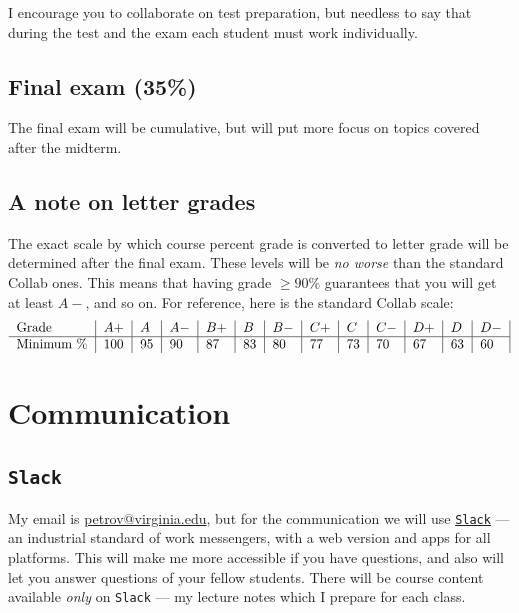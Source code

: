 \documentclass[oneside,11pt]{amsart}
\begin{document}
I encourage you to collaborate on test preparation, but needless to say that
during the test and the exam each student must work individually.

\subsection{Final exam (35\%)}

The final exam will be cumulative, but will put more focus on topics covered after the midterm.

\subsection*{A note on letter grades}

The exact scale
by which course percent grade is converted to letter grade
will be determined after the final exam. 
These levels will be \emph{no worse} than the standard Collab ones. 
This means that having grade $\ge 90\%
$
guarantees that you will get at least $A-$, and so on.
For reference, here is the standard Collab scale:
\begin{equation*}
	\begin{tabular}{l|l|l|l|l|l|l|l|l|l|l|l|l|}
		Grade      & $ A+	$ & $A	$ & $A-	$ & $B+	$ & $B	$ & $B-	$ & $C+	$ & $C	$ & $C-	$ & $D+	$ & $D	$ & $D-$ \\
		\hline
		Minimum \% & 100     & 95   & 90    & 87    & 83    & 80    & 77    & 73    & 70    & 67    & 63    & 60
	\end{tabular}
\end{equation*}


\section{Communication}
\label{comm}

\subsection{\texttt{Slack}}

My email is \href{mailto:petrov@virginia.edu}{petrov@virginia.edu}, but for the
communication we will use \href{https://slack.com}{\texttt{Slack}} --- an
industrial standard of work messengers, with a web version and apps for all
platforms. This will make me more accessible if you have questions, and also
will let you answer questions of your fellow students. There will be course
content available \emph{only} on \texttt{Slack} --- my
lecture notes which I prepare for each class.
\end{document}
